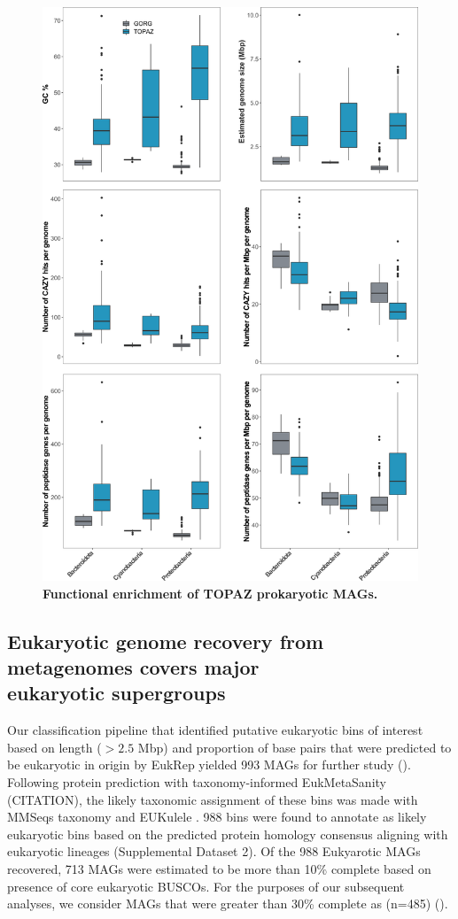 \documentclass[12pt]{article}
\numberwithin{equation}{section}
\begin{document}
\begin{figure}[h!]    
    \centering
    \includegraphics[width = 0.75\columnwidth]{figures/Figure2-TOPAZ_prok_features_vsGORG_mod.png}
    \caption{\textbf{Functional enrichment of TOPAZ prokaryotic MAGs.} }
    \label{fig:fig4-trophy}
\end{figure}

\subsection*{Eukaryotic genome recovery from metagenomes covers major \\ eukaryotic supergroups}
Our classification pipeline that identified putative eukaryotic bins of interest based on length ($>2.5$ Mbp) and proportion of base pairs that were predicted to be eukaryotic in origin by EukRep yielded 993 MAGs for further study (). Following protein prediction with taxonomy-informed EukMetaSanity (CITATION), the likely taxonomic assignment of these bins was made with MMSeqs taxonomy \citep{Steinegger2018} and EUKulele \citep{Krinos2021EUKulele}. 988 bins were found to annotate as likely eukaryotic bins based on the predicted protein homology consensus aligning with eukaryotic lineages (Supplemental Dataset 2). Of the 988 Eukyarotic MAGs recovered, 713 MAGs were estimated to be more than 10\% complete based on presence of core eukaryotic BUSCOs. For the purposes of our subsequent analyses, we consider MAGs that were greater than 30\% complete as (n=485) (). 
\end{document}
